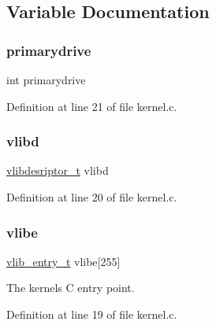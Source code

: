 \subsection{Variable Documentation}
\mbox{\label{a00068_af37cb131d8a2101addfbf5fb2d8a53b4_af37cb131d8a2101addfbf5fb2d8a53b4}} 
\subsubsection{\texorpdfstring{primarydrive}{primarydrive}}
{\footnotesize\ttfamily int primarydrive}



Definition at line 21 of file kernel.\+c.

\mbox{\label{a00068_a2125beec541d04796805161dbec05fcf_a2125beec541d04796805161dbec05fcf}} 
\subsubsection{\texorpdfstring{vlibd}{vlibd}}
{\footnotesize\ttfamily \hyperlink{a00200_a2d9000b4fbb25c5ed2950a2d8f4921d5_a2d9000b4fbb25c5ed2950a2d8f4921d5}{vlibdesriptor\+\_\+t} vlibd}



Definition at line 20 of file kernel.\+c.

\mbox{\label{a00068_af69f4f709fdab28dec6b8fb75fb4d526_af69f4f709fdab28dec6b8fb75fb4d526}} 
\subsubsection{\texorpdfstring{vlibe}{vlibe}}
{\footnotesize\ttfamily \hyperlink{a00200_a97c1a7136f2ab06368e93c2d7533d619_a97c1a7136f2ab06368e93c2d7533d619}{vlib\+\_\+entry\+\_\+t} vlibe\mbox{[}255\mbox{]}}



The kernels C entry point. 



Definition at line 19 of file kernel.\+c.

